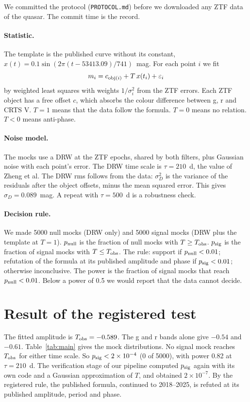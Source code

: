 \documentclass[11pt]{article}
\newcommand{\Tobs}{T_{\rm obs}}
\newcommand{\psig}{p_{\rm sig}}
\newcommand{\pnull}{p_{\rm null}}
\begin{document}
We committed the protocol (\texttt{PROTOCOL.md}) before we downloaded any ZTF data of the quasar. The commit time is the record.

\paragraph{Statistic.} The template is the published curve without its constant, $x(t) = 0.1 \sin(2\pi(t - 53413.09)/741)$~mag. For each point $i$ we fit
\begin{equation}
m_i = c_{{\rm obj}(i)} + T\,x(t_i) + \varepsilon_i
\end{equation}
by weighted least squares with weights $1/\sigma_i^2$ from the ZTF errors. Each ZTF object has a free offset $c$, which absorbs the colour difference between g, r and CRTS V. $T = 1$ means that the data follow the formula. $T = 0$ means no relation. $T < 0$ means anti-phase.

\paragraph{Noise model.} The mocks use a DRW at the ZTF epochs, shared by both filters, plus Gaussian noise with each point's error. The DRW time scale is $\tau = 210$~d, the value of Zheng et al. The DRW rms follows from the data: $\sigma_D^2$ is the variance of the residuals after the object offsets, minus the mean squared error. This gives $\sigma_D = 0.089$~mag. A repeat with $\tau = 500$~d is a robustness check.

\paragraph{Decision rule.} We made 5000 null mocks (DRW only) and 5000 signal mocks (DRW plus the template at $T = 1$). $\pnull$ is the fraction of null mocks with $T \ge \Tobs$. $\psig$ is the fraction of signal mocks with $T \le \Tobs$. The rule: support if $\pnull < 0.01$; refutation of the formula at its published amplitude and phase if $\psig < 0.01$; otherwise inconclusive. The power is the fraction of signal mocks that reach $\pnull < 0.01$. Below a power of 0.5 we would report that the data cannot decide.

\section{Result of the registered test}
\label{sec:result}

The fitted amplitude is $\Tobs = -0.589$. The g and r bands alone give $-0.54$ and $-0.61$. Table~\ref{tab:main} gives the mock distributions. No signal mock reaches $\Tobs$ for either time scale. So $\psig < 2\times10^{-4}$ (0 of 5000), with power 0.82 at $\tau = 210$~d. The verification stage of our pipeline computed $\psig$ again with its own code and a Gaussian approximation of $T$, and obtained $2\times10^{-7}$. By the registered rule, the published formula, continued to 2018--2025, is refuted at its published amplitude, period and phase.
\end{document}
